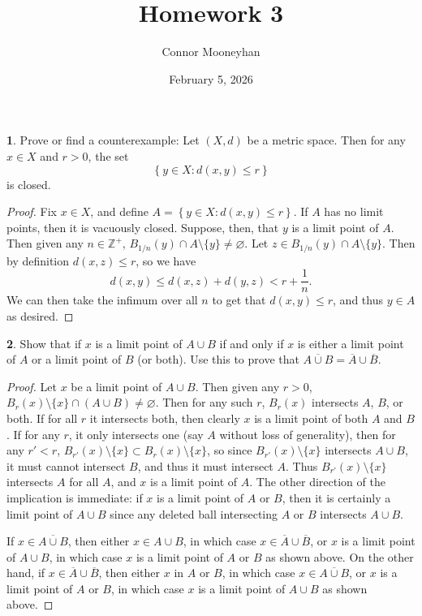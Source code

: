 \documentclass[12pt]{article}
\title{Homework 3}
\author{Connor Mooneyhan}
\date{February 5, 2026}
\theoremstyle{definition}
\newtheorem{ex}{}
\begin{document}
\maketitle

\begin{ex}
	Prove or find a counterexample: Let $(X, d)$ be a metric space.
	Then for any $x \in X$ and $r > 0$, the set \begin{equation*}
		\left\lbrace y \in X : d(x, y) \leq r \right\rbrace
	\end{equation*}
	is closed.
\end{ex}
\begin{proof}
	Fix $x \in X$, and define $A = \left\lbrace y \in X : d(x, y) \leq r \right\rbrace$.
	If $A$ has no limit points, then it is vacuously closed.
	Suppose, then, that $y$ is a limit point of $A$.
	Then given any $n \in \mathbb{Z}^+$, $B_{1/n}(y) \cap A \setminus \lbrace y \rbrace \neq \varnothing$.
	Let $z \in B_{1/n}(y) \cap A \setminus \lbrace y \rbrace$.
	Then by definition $d(x, z) \leq r$, so we have \begin{equation*}
		d(x, y) \leq d(x, z) + d(y, z) < r + \frac{1}{n}.
	\end{equation*}
	We can then take the infimum over all $n$ to get that $d(x, y) \leq r$, and thus $y \in A$ as desired.
\end{proof}

\begin{ex}
	Show that if $x$ is a limit point of $A \cup B$ if and only if $x$ is either a limit point of $A$ or a limit point of $B$ (or both).
	Use this to prove that $\overline{A \cup B} = \overline{A} \cup \overline{B}$.
\end{ex}
\begin{proof}
	Let $x$ be a limit point of $A \cup B$.
	Then given any $r > 0$, $B_r(x) \setminus \lbrace x \rbrace \cap (A \cup B) \neq \varnothing$.
	Then for any such $r$, $B_r(x)$ intersects $A$, $B$, or both.
	If for all $r$ it intersects both, then clearly $x$ is a limit point of both $A$ and $B$.
	If for any $r$, it only intersects one (say $A$ without loss of generality), then for any $r' < r$, $B_{r'}(x) \setminus \lbrace x \rbrace \subset B_r(x) \setminus \lbrace x \rbrace$, so since $B_{r'}(x) \setminus \lbrace x \rbrace$ intersects $A \cup B$, it must cannot intersect $B$, and thus it must intersect $A$.
	Thus $B_{r'}(x) \setminus \lbrace x \rbrace$ intersects $A$ for all $A$, and $x$ is a limit point of $A$.
	The other direction of the implication is immediate: if $x$ is a limit point of $A$ or $B$, then it is certainly a limit point of $A \cup B$ since any deleted ball intersecting $A$ or $B$ intersects $A \cup B$.

	If $x \in \overline{A \cup B}$, then either $x \in A \cup B$, in which case $x \in \overline{A} \cup \overline{B}$, or $x$ is a limit point of $A \cup B$, in which case $x$ is a limit point of $A$ or $B$ as shown above.
	On the other hand, if $x \in \overline{A} \cup \overline{B}$, then either $x$ in $A$ or $B$, in which case $x \in \overline{A \cup B}$, or $x$ is a limit point of $A$ or $B$, in which case $x$ is a limit point of $A \cup B$ as shown above.
\end{proof}
\end{document}
